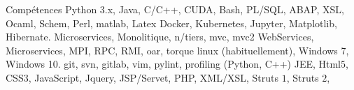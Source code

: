 \begin{rubric}{Compétences}
%
	Python $3$.x, Java,  C/C++, CUDA, Bash, PL/SQL, ABAP, XSL, Ocaml, Schem, Perl, matlab, Latex 
%
	Docker, Kubernetes, Jupyter, Matplotlib,  Hibernate.
%
	Microservices, Monolitique, n/tiers, mvc, mvc2
%
	WebServices, Microservices, MPI, RPC, RMI, oar, torque
\entry*[OS]%
    linux (habituellement), Windows 7, Windows 10. 
\entry*[Outils]%
    git, svn, gitlab, vim, pylint, profiling (Python, C++) 
%
  	JEE, Html$5$, CSS$3$, JavaScript, Jquery, JSP/Servet, PHP, XML/XSL, Struts $1$, Struts $2$,
\end{rubric}
